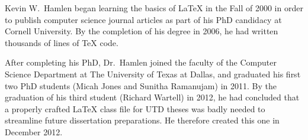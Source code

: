 \documentclass[doublespacing]{utdthesis}
\begin{document}
\begin{biosketch}
Kevin W.~Hamlen began learning the basics of \LaTeX{} in the Fall of 2000 in
order to publish computer science journal articles as part of his
PhD candidacy at Cornell University.
By the completion of his degree in 2006, he had written thousands of lines of
\TeX{} code.

After completing his PhD, Dr.~Hamlen joined the faculty of the Computer
Science Department at The University of Texas at Dallas, and graduated his
first two PhD students (Micah Jones and Sunitha Ramanujam) in 2011.
By the graduation of his third student (Richard Wartell) in 2012, he had
concluded that a properly crafted \LaTeX{} class file for UTD theses was badly
needed to streamline future dissertation preparations.
He therefore created this one in December 2012.
\end{biosketch}
\end{document}
